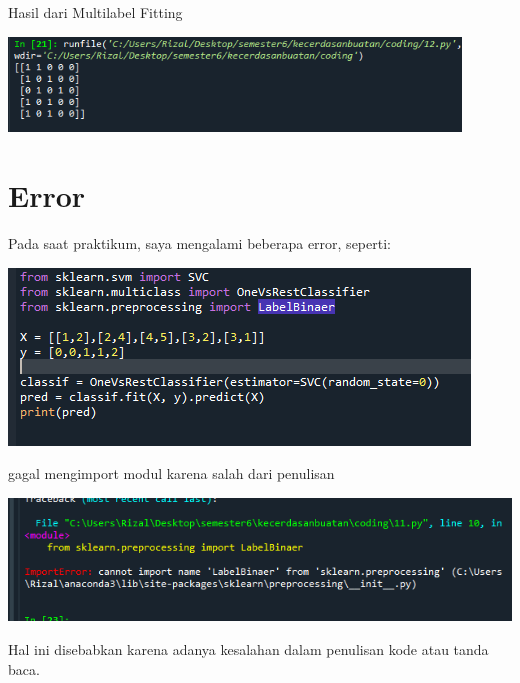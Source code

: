 \documentclass{article}
\begin{document}
Hasil dari Multilabel Fitting
    \begin{center}
    \includegraphics[width=12cm]{figures/1184033/chapter1/30.PNG}
    \end{center}

\section{Error}
Pada saat praktikum, saya mengalami beberapa error, seperti:
\begin{center}
    \includegraphics[width=.8\textwidth]{figures/1184033/chapter1/error1.PNG}
\end{center}
gagal mengimport modul karena salah dari penulisan
\begin{center}
    \includegraphics[width=.8\textwidth]{figures/1184033/chapter1/error2.PNG}
\end{center}
Hal ini disebabkan karena adanya kesalahan dalam penulisan kode atau tanda baca.
\end{document}

